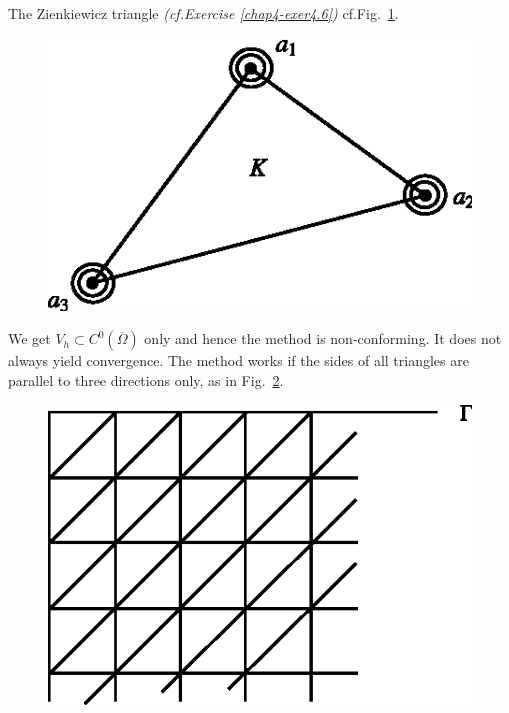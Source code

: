 \begin{example}\label{chap11-exam11.2}
The Zienkiewicz triangle {\em (cf.\@ Exercise \ref{chap4-exer4.6})}
cf.\@ Fig.~\ref{chap11-fig11.4}.
\begin{figure}[H]
\centering
\includegraphics{figure/fig11.4.eps}
\caption{}\label{chap11-fig11.4}
\end{figure}

We get $V_{h}\subset C^{0}(\overline{\Omega})$ only and hence the
method is non-conforming. It does not always yield convergence. The
method works if the sides of all triangles are parallel to three
directions only, as in Fig.~\ref{chap11-fig11.5}.
\begin{figure}[H]
\centering
\includegraphics{figure/fig11.5.eps}
\caption{}\label{chap11-fig11.5}
\end{figure}


\end{example}
